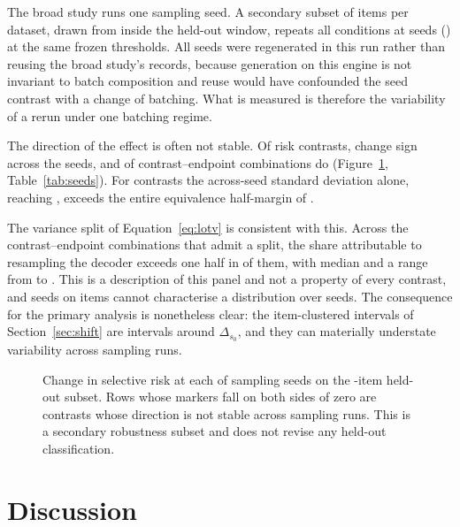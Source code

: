 \documentclass[information,article,submit,moreauthors]{Definitions/mdpi}
\begin{document}
The broad study runs one sampling seed. A secondary subset of
\SeedSubsetItems{} items per dataset, drawn from inside the held-out window,
repeats all conditions at \NumSeeds{} seeds (\SeedList{}) at the same frozen
thresholds. All \NumSeeds{} seeds were regenerated in this run rather than
reusing the broad study's records, because generation on this engine is not
invariant to batch composition and reuse would have confounded the seed contrast
with a change of batching. What is measured is therefore the variability of a
rerun under one batching regime.

The direction of the effect is often not stable. Of \NumSeedContrasts{} risk
contrasts, \NumSeedSignFlipRisk{} change sign across the \NumSeeds{} seeds, and
\NumSeedSignFlipAll{} of \NumSeedEndpointCombos{} contrast--endpoint
combinations do (Figure~\ref{fig:seeds}, Table~\ref{tab:seeds}). For
\NumSeedSDExceedsMargin{} contrasts the across-seed standard deviation alone,
reaching \MaxSeedSD{}, exceeds the entire equivalence half-margin of
\MarginRisk{}.

The variance split of Equation~\eqref{eq:lotv} is consistent with this. Across
the \NumVarianceSplits{} contrast--endpoint combinations that admit a split, the
share attributable to resampling the decoder exceeds one half in
\NumSeedShareAboveHalf{} of them, with median \MedianSeedShare{} and a range
from \MinSeedShare{} to \MaxSeedShare{}. This is a description of this panel and
not a property of every contrast, and \NumSeeds{} seeds on
\SeedSubsetItems{} items cannot characterise a distribution over seeds.
The consequence for the primary analysis is nonetheless clear: the
item-clustered intervals of Section~\ref{sec:shift} are intervals around
$\Delta_{s_0}$, and they can materially understate variability across
sampling runs.

\begin{figure}[H]
\centering

\caption{Change in selective risk at each of \NumSeeds{} sampling seeds on the
\SeedSubsetItems{}-item held-out subset. Rows whose markers fall on both sides
of zero are contrasts whose direction is not stable across sampling runs. This
is a secondary robustness subset and does not revise any
held-out classification.\label{fig:seeds}}
\end{figure}



\section{Discussion}
\end{document}
